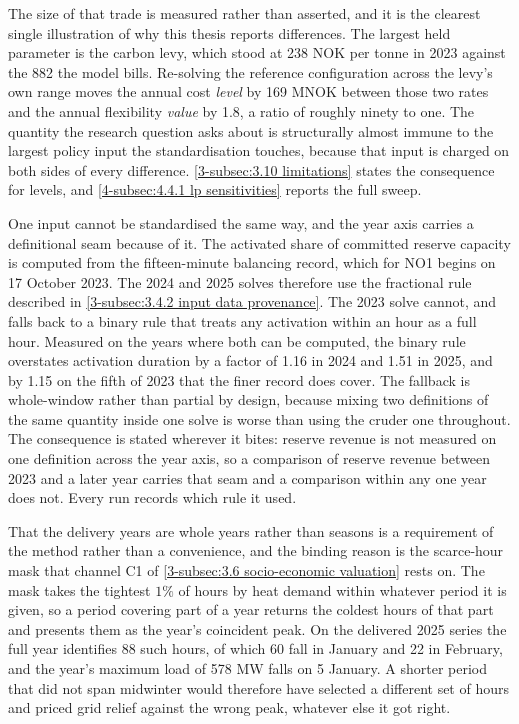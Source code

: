 The size of that trade is measured rather than asserted, and it is the clearest single illustration of why this thesis reports differences. The largest held parameter is the carbon levy, which stood at 238 NOK per tonne in 2023 against the 882 the model bills. Re-solving the reference configuration across the levy's own range moves the annual cost \emph{level} by 169 MNOK between those two rates and the annual flexibility \emph{value} by 1.8, a ratio of roughly ninety to one. The quantity the research question asks about is structurally almost immune to the largest policy input the standardisation touches, because that input is charged on both sides of every difference. \autoref{3-subsec:3.10 limitations} states the consequence for levels, and \autoref{4-subsec:4.4.1 lp sensitivities} reports the full sweep.

One input cannot be standardised the same way, and the year axis carries a definitional seam because of it. The activated share of committed reserve capacity is computed from the fifteen-minute balancing record, which for NO1 begins on 17 October 2023. The 2024 and 2025 solves therefore use the fractional rule described in \autoref{3-subsec:3.4.2 input data provenance}. The 2023 solve cannot, and falls back to a binary rule that treats any activation within an hour as a full hour. Measured on the years where both can be computed, the binary rule overstates activation duration by a factor of 1.16 in 2024 and 1.51 in 2025, and by 1.15 on the fifth of 2023 that the finer record does cover. The fallback is whole-window rather than partial by design, because mixing two definitions of the same quantity inside one solve is worse than using the cruder one throughout. The consequence is stated wherever it bites: reserve revenue is not measured on one definition across the year axis, so a comparison of reserve revenue between 2023 and a later year carries that seam and a comparison within any one year does not. Every run records which rule it used.

That the delivery years are whole years rather than seasons is a requirement of the method rather than a convenience, and the binding reason is the scarce-hour mask that channel C1 of \autoref{3-subsec:3.6 socio-economic valuation} rests on. The mask takes the tightest $1\%$ of hours by heat demand within whatever period it is given, so a period covering part of a year returns the coldest hours of that part and presents them as the year's coincident peak. On the delivered 2025 series the full year identifies 88 such hours, of which 60 fall in January and 22 in February, and the year's maximum load of 578 MW falls on 5 January. A shorter period that did not span midwinter would therefore have selected a different set of hours and priced grid relief against the wrong peak, whatever else it got right.

